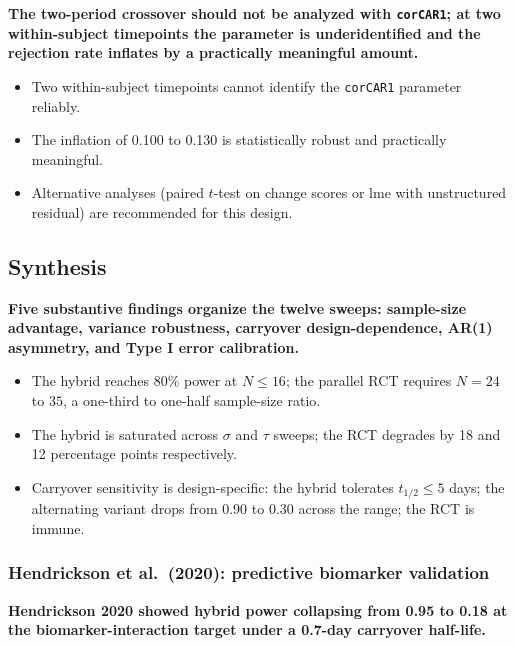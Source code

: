 \documentclass[
  11pt,
]{article}
\begin{document}
\textbf{The two-period crossover should not be analyzed with \texttt{corCAR1}; at two within-subject timepoints the parameter is underidentified and the rejection rate inflates by a practically meaningful amount.}

\begin{itemize}\setlength{\itemsep}{2pt}\setlength{\parskip}{0pt}
\item Two within-subject timepoints cannot identify the \texttt{corCAR1} parameter reliably.
\item The inflation of 0.100 to 0.130 is statistically robust and practically meaningful.
\item Alternative analyses (paired $t$-test on change scores or lme with unstructured residual) are recommended for this design.
\end{itemize}

\subsection{Synthesis}\label{synthesis}

\textbf{Five substantive findings organize the twelve sweeps: sample-size advantage, variance robustness, carryover design-dependence, AR(1) asymmetry, and Type I error calibration.}

\begin{itemize}\setlength{\itemsep}{2pt}\setlength{\parskip}{0pt}
\item The hybrid reaches 80\% power at $N \leq 16$; the parallel RCT requires $N = 24$ to $35$, a one-third to one-half sample-size ratio.
\item The hybrid is saturated across $\sigma$ and $\tau$ sweeps; the RCT degrades by 18 and 12 percentage points respectively.
\item Carryover sensitivity is design-specific: the hybrid tolerates $t_{1/2} \leq 5$ days; the alternating variant drops from 0.90 to 0.30 across the range; the RCT is immune.
\end{itemize}

\subsubsection{Hendrickson et al.~(2020): predictive biomarker validation}\label{hendrickson-et-al.-2020-predictive-biomarker-validation}

\textbf{Hendrickson 2020 showed hybrid power collapsing from 0.95 to 0.18 at the biomarker-interaction target under a 0.7-day carryover half-life.}
\end{document}
